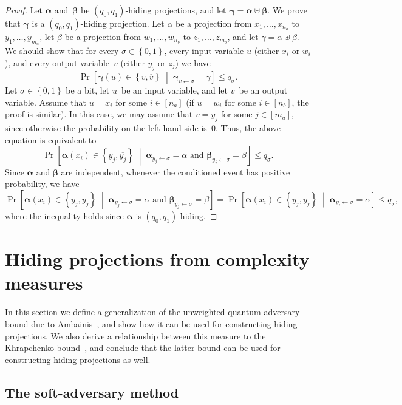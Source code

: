 \documentclass[11pt]{article}
\numberwithin{equation}{section}
\theoremstyle{definition}
\theoremstyle{plain}
\theoremstyle{definition}\newtheorem{notation}[theorem]{Notation}\theoremstyle{plain}
\newcommand{\B}{\left\{ 0,1 \right \}}
\newcommand{\ga}{\boldsymbol{\alpha}}
\newcommand{\gb}{\boldsymbol{\beta}}
\newcommand{\ggm}{\boldsymbol{\gamma}}
\theoremstyle{definition}
\theoremstyle{plain}
\begin{document}
\begin{proof}
Let $\ga$ and~$\gb$ be $(q_{0},q_{1})$-hiding projections, and
let $\ggm=\ga\uplus\gb$. We prove that $\ggm$ is a $(q_{0},q_{1})$-hiding
projection. Let $\alpha$ be a projection from $x_{1},\ldots,x_{n_{a}}$
to $y_{1},\ldots,y_{m_{a}}$, let $\beta$ be a projection from $w_{1},\ldots,w_{n_{b}}$
to $z_{1},\ldots,z_{m_{b}}$, and let $\gamma=\alpha\uplus\beta$.
We should show that for every $\sigma\in\B$, every input variable
$u$ (either $x_{i}$ or $w_{i}$), and every output variable~$v$
(either $y_{j}$ or $z_{j}$) we have 
\[
\Pr\!\left[\ggm(u)\in\left\{ v,\overline{v}\right\} \;\middle|\;\ggm_{v\gets\sigma}=\gamma\right]\leq q_{\sigma}.
\]
Let $\sigma\in\B$ be a bit, let $u$~be an input variable, and let
$v$~be an output variable. Assume that $u=x_{i}$ for some $i\in\left[n_{a}\right]$
(if $u=w_{i}$ for some $i\in\left[n_{b}\right]$, the proof is similar).
In this case, we may assume that $v=y_{j}$ for some $j\in\left[m_{a}\right]$,
since otherwise the probability on the left-hand side is~$0$. Thus,
the above equation is equivalent to 
\[
\Pr\!\left[\ga(x_{i})\in\left\{ y_{j},\overline{y_{j}}\right\} \;\middle|\;\ga_{y_{j}\gets\sigma}=\alpha\text{ and }\gb_{y_{j}\gets\sigma}=\beta\right]\leq q_{\sigma}.
\]
Since $\ga$ and $\gb$ are independent, whenever the conditioned
event has positive probability, we have 
\[
\Pr\!\left[\ga(x_{i})\in\left\{ y_{j},\overline{y_{j}}\right\} \;\middle|\;\ga_{y_{j}\gets\sigma}=\alpha\text{ and }\gb_{y_{j}\gets\sigma}=\beta\right]=\Pr\!\left[\ga(x_{i})\in\left\{ y_{j},\overline{y_{j}}\right\} \;\middle|\;\ga_{y_{i}\gets\sigma}=\alpha\right]\leq q_{\sigma},
\]
where the inequality holds since $\ga$ is $(q_{0},q_{1})$-hiding. 
\end{proof}

\section{\label{sec:hiding-from-complexity}Hiding projections from complexity
measures}

In this section we define a generalization of the unweighted quantum
adversary bound due to Ambainis~\cite{A02}, and show how it can
be used for constructing hiding projections. We also derive a relationship
between this measure to the Khrapchenko bound~\cite{K72}, and conclude
that the latter bound can be used for constructing hiding projections
as well. 

\subsection{\label{sec:adversary}The soft-adversary method}
\end{document}
